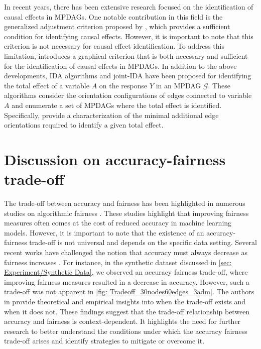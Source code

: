 \documentclass{article} %
\begin{document}
In recent years, there has been extensive research focused on the identification of causal effects in MPDAGs. One notable contribution in this field is the generalized adjustment criterion proposed by \cite{perkovic2015complete, perkovic2017interpreting, perkovi2018complete}, which provides a sufficient condition for identifying causal effects. However, it is important to note that this criterion is not necessary for causal effect identification. To address this limitation, \citet{perkovic2020identifying} introduces a graphical criterion that is both necessary and sufficient for the identification of causal effects in MPDAGs. In addition to the above developments, IDA algorithms and joint-IDA \cite{maathuis2009estimating, nandy2017estimating, perkovic2017interpreting, witte2020efficient, fang2020ida, liu2020collapsible} have been proposed for identifying the total effect of a variable $A$ on the response $Y$ in an MPDAG $\mathcal{G}$. These algorithms consider the orientation configurations of edges connected to variable $A$ and enumerate a set of MPDAGs where the total effect is identified. Specifically, \citet{guo2021minimal} provide a characterization of the minimal additional edge orientations required to identify a given total effect.%
\section{Discussion on accuracy-fairness trade-off} \label{Appendix: Discussion on Accuracy-fairness trade-off}

The trade-off between accuracy and fairness has been highlighted in numerous studies on algorithmic fairness \citep{martinez2019fairness, zhao2019inherent, menon2018cost, zliobaite2015relation, chen2018my, wei2022}. These studies highlight that improving fairness measures often comes at the cost of reduced accuracy in machine learning models. However, it is important to note that the existence of an accuracy-fairness trade-off is not universal and depends on the specific data setting. Several recent works have challenged the notion that accuracy must always decrease as fairness increases \citep{dutta2020there,  friedler2021possibility, Yeom2018DiscriminativeBN}. For instance, in the synthetic dataset discussed in \cref{sec: Experiment/Synthetic Data}, we observed an accuracy fairness trade-off, where improving fairness measures resulted in a decrease in accuracy. However, such a trade-off was not apparent in \cref{fig: Tradeoff_30nodes60edges_3adm}. The authors in \citep{wick2019unlocking, inproceedings, dutta2020there} provide theoretical and empirical insights into when the trade-off exists and when it does not. These findings suggest that the trade-off relationship between accuracy and fairness is context-dependent. It highlights the need for further research to better understand the conditions under which the accuracy fairness trade-off arises and identify strategies to mitigate or overcome it.%
\end{document}
